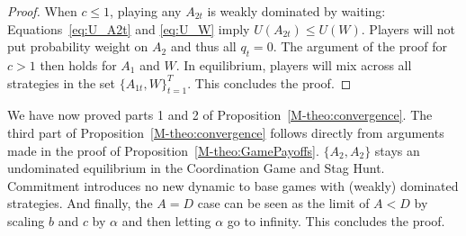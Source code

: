 \documentclass[letterpaper]{article}
\newcommand{\bparam}{b}
\newcommand{\cparam}{c}
\theoremstyle{definition}
\begin{document}
\begin{proof}
When $\cparam\leq1$, playing any $A_{2t}$ is weakly dominated by waiting: Equations~\eqref{eq:U_A2t} and \eqref{eq:U_W} imply $U(A_{2t})\leq U(W)$.
Players will not put probability weight on $A_2$ and thus all $q_t=0$. The argument of the proof for $\cparam>1$ then holds for $A_1$ and $W$. In equilibrium, players will mix across all strategies in the set $\{A_{1t}, W\}_{t=1}^{T}$. This concludes the proof.
\end{proof}
We have now proved parts 1 and 2 of Proposition~\ref{M-theo:convergence}. The third part of Proposition~\ref{M-theo:convergence} follows directly from arguments made in the proof of Proposition~\ref{M-theo:GamePayoffs}. $\{A_2,A_2\}$ stays an undominated equilibrium in the Coordination Game and Stag Hunt. Commitment introduces no new dynamic to base games with (weakly) dominated strategies. And finally, the $A=D$ case can be seen as the limit of $A<D$ by scaling $\bparam$ and $\cparam$ by $\alpha$ and then letting $\alpha$ go to infinity. This concludes the proof.
\end{document}
